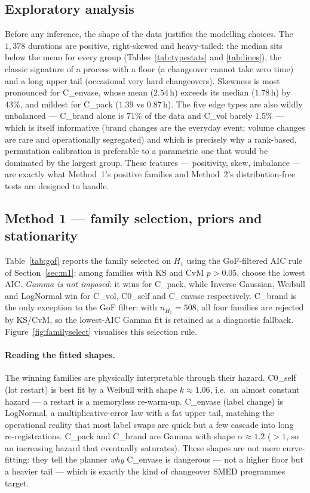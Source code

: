 \documentclass[11pt,a4paper]{article}
\begin{document}
\subsection{Exploratory analysis}\label{sec:eda}
Before any inference, the shape of the data justifies the modelling choices. The
$1{,}378$ durations are positive, right-skewed and heavy-tailed: the median sits
below the mean for every group (Tables~\ref{tab:typestats} and \ref{tab:lines}),
the classic signature of a process with a floor (a changeover cannot take zero
time) and a long upper tail (occasional very hard changeovers). Skewness is most
pronounced for C\_envase, whose mean ($2.54$\,h) exceeds its median ($1.78$\,h) by
$43\%$, and mildest for C\_pack ($1.39$ vs $0.87$\,h). The five edge types are
also wildly unbalanced --- C\_brand alone is $71\%$ of the data and C\_vol barely
$1.5\%$ --- which is itself informative (brand changes are the everyday event;
volume changes are rare and operationally segregated) and which is precisely why a
rank-based, permutation calibration is preferable to a parametric one that would
be dominated by the largest group. These features --- positivity, skew, imbalance
--- are exactly what Method~1's positive families and Method~2's distribution-free
tests are designed to handle.

\subsection{Method 1 --- family selection, priors and stationarity}
Table~\ref{tab:gof} reports the family selected on $H_1$ using the GoF-filtered
AIC rule of Section~\ref{sec:m1}: among families with KS and CvM $p>0.05$, choose
the lowest AIC. \emph{Gamma is not imposed}: it wins for C\_pack, while Inverse
Gaussian, Weibull and LogNormal win for C\_vol, C0\_self and C\_envase
respectively. C\_brand is the only exception to the GoF filter: with
$n_{H_1}=508$, all four families are rejected by KS/CvM, so the lowest-AIC Gamma
fit is retained as a diagnostic fallback. Figure~\ref{fig:familyselect}
visualises this selection rule.

\paragraph{Reading the fitted shapes.}
The winning families are physically interpretable through their hazard. C0\_self
(lot restart) is best fit by a Weibull with shape $k\approx1.06$, i.e.\ an almost
constant hazard --- a restart is a memoryless re-warm-up. C\_envase (label change)
is LogNormal, a multiplicative-error law with a fat upper tail, matching the
operational reality that most label swaps are quick but a few cascade into long
re-registrations. C\_pack and C\_brand are Gamma with shape $\alpha\approx1.2$
($>1$, so an increasing hazard that eventually saturates). These shapes are not
mere curve-fitting: they tell the planner \emph{why} C\_envase is dangerous --- not
a higher floor but a heavier tail --- which is exactly the kind of changeover SMED
programmes target.
\end{document}
